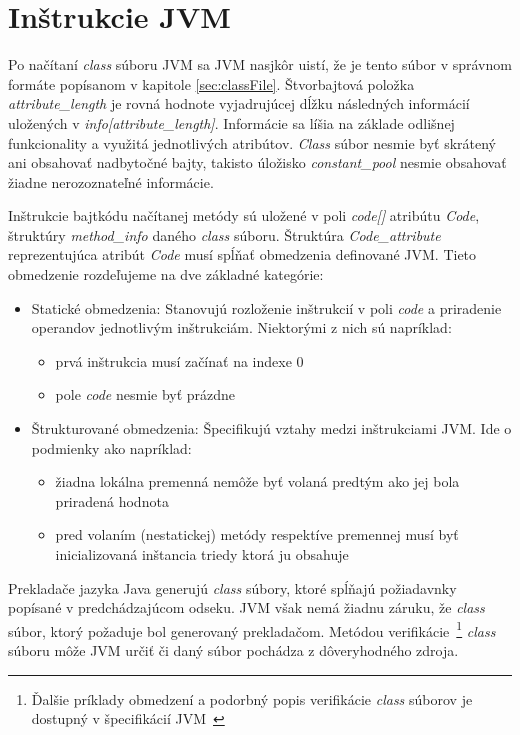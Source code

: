 \documentclass[11pt,final,oneside]{fithesis}
\begin{document}
\section{Inštrukcie JVM}
Po načítaní \textit{class} súboru JVM sa JVM nasjkôr uistí, že je tento súbor
v správnom formáte popísanom v kapitole \ref{sec:classFile}. Štvorbajtová
položka \textit{attribute\_length} je rovná hodnote vyjadrujúcej
dĺžku následných informácií uložených v \textit{info[attribute\_length]}.
Informácie sa líšia na základe odlišnej funkcionality a využitá jednotlivých
atribútov. \textit{Class} súbor nesmie byť skrátený ani obsahovať nadbytočné
bajty, takisto úložisko \textit{constant\_pool} nesmie obsahovať žiadne
nerozoznateľné informácie.

Inštrukcie bajtkódu načítanej metódy sú uložené v poli \textit{code[]}
atribútu \textit{Code}, štruktúry \textit{method\_info} daného \textit{class}
súboru. Štruktúra \textit{Code\_attribute} reprezentujúca atribút \textit{Code}
musí spĺňať obmedzenia definované JVM. Tieto obmedzenie rozdeľujeme na dve
základné kategórie: 

\begin{itemize}
\item Statické obmedzenia: Stanovujú rozloženie inštrukcií v poli \textit{code}
a priradenie operandov jednotlivým inštrukciám. Niektorými z nich sú napríklad:
\begin{itemize}
\item prvá inštrukcia musí začínať na indexe 0
\item pole \textit{code} nesmie byť prázdne
\end{itemize}
\item Štrukturované obmedzenia: Špecifikujú vztahy medzi inštrukciami JVM. Ide
o podmienky ako napríklad:
\begin{itemize}
\item žiadna lokálna premenná nemôže byť volaná predtým ako jej bola priradená
hodnota
\item pred volaním (nestatickej) metódy respektíve premennej musí byť
inicializovaná inštancia triedy ktorá ju obsahuje
\end{itemize}
\end{itemize}

Prekladače jazyka Java generujú \textit{class} súbory, ktoré spĺňajú požiadavnky
popísané v predchádzajúcom odseku. JVM však nemá žiadnu záruku, že
\textit{class} súbor, ktorý požaduje bol generovaný prekladačom. Metódou
verifikácie~\footnote{Ďalšie príklady obmedzení a podorbný popis verifikácie
\textit{class} súborov je dostupný v špecifikácií
JVM~\cite{Lindholm:2013:JVM:2462629}} \textit{class} súboru môže JVM určiť či
daný súbor pochádza z dôveryhodného zdroja.
\end{document}
